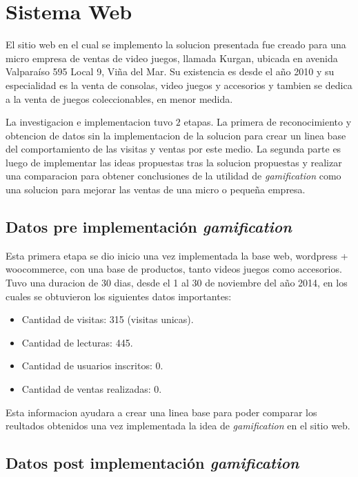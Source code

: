 \section{Sistema Web}

El sitio web en el cual se implemento la solucion presentada fue creado para una micro empresa de
ventas de video juegos, llamada Kurgan, ubicada en avenida Valparaíso 595 Local 9, Viña del Mar.
Su existencia es desde el año 2010 y su especialidad es la venta de consolas, video juegos y
accesorios y tambien se dedica a la venta de juegos coleccionables, en menor medida.

La investigacion e implementacion tuvo $2$ etapas. La primera de reconocimiento y obtencion de 
datos sin la implementacion de la solucion para crear un linea base del comportamiento de las visitas
y ventas por este medio. La segunda parte es luego de implementar las ideas propuestas tras la solucion
propuestas y realizar una comparacion para obtener conclusiones de la utilidad de \emph{gamification}
como una solucion para mejorar las ventas de una micro o pequeña empresa.

\subsection{Datos pre implementación \emph{gamification}}
 
Esta primera etapa se dio inicio una vez implementada la base web, wordpress + woocommerce, con
una base de productos, tanto videos juegos como accesorios. Tuvo una duracion de 30 dias, desde el 1
 al 30 de noviembre del año 2014, en los cuales se obtuvieron los siguientes datos importantes:

\begin{itemize}
\item Cantidad de visitas: 315 (visitas unicas).
\item Cantidad de lecturas: 445.
\item Cantidad de usuarios inscritos: 0.
\item Cantidad de ventas realizadas: 0.
\end{itemize}

Esta informacion ayudara a crear una linea base para poder comparar los reultados obtenidos una vez
implementada la idea de \emph{gamification} en el sitio web. 

\subsection{Datos post implementación \emph{gamification}}

